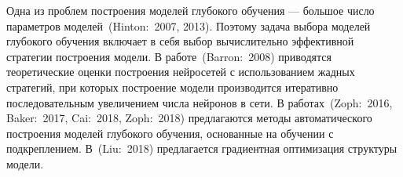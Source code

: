 \documentclass[11pt, a5paper]{dissert}
\theoremstyle{definition}
\begin{document}
Одна из проблем построения моделей глубокого обучения --- большое число параметров моделей~(Hinton:~2007, 2013). Поэтому задача выбора моделей глубокого обучения включает в себя выбор вычислительно эффективной стратегии построения модели. В работе~(Barron:~2008) приводятся теоретические оценки построения нейросетей с использованием жадных стратегий,  при которых построение модели производится итеративно последовательным увеличением числа нейронов в сети. %
В работах~(Zoph:~2016, Baker:~2017, Cai:~2018, Zoph:~2018) предлагаются методы автоматического построения моделей глубокого обучения, основанные на обучении с подкреплением. В~(Liu:~2018) предлагается градиентная оптимизация структуры модели.

\end{document}
